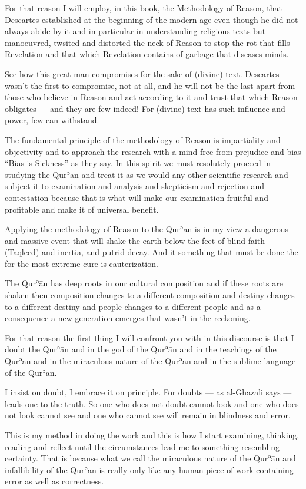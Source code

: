 \documentclass[12pt]{memoir}
\def\´{ʾ} %
\def \Quran{Qur\-\´ān} %
\let \Qrn=\Quran      %
\begin{document}
For that reason I will employ, in this book, the Methodology of Reason, that
Descartes established at the beginning of the modern age even though he did not
always abide by it and in particular in understanding religious texts but
manoeuvred, twsited and distorted the neck of Reason to stop the rot that fills
Revelation and that which Revelation contains of garbage that diseases minds.

See how this great man compromises for the sake of (divine) text. Descartes
wasn’t the first to compromise, not at all, and he will not be the last apart
from those who believe in Reason and act according to it and trust that which
Reason obligates — and they are few indeed! For (divine) text has such
influence and power, few can withstand.

The fundamental principle of the methodology of Reason is impartiality and
objectivity and to approach the research with a mind free from prejudice and
bias “Bias is Sickness” as they say. In this spirit we must resolutely proceed
in studying the \Qrn{} and treat it as we would any other scientific research
and subject it to examination and analysis and skepticism and rejection and
contestation because that is what will make our examination fruitful and
profitable and make it of universal benefit.

Applying the methodology of Reason to the \Qrn{} is in my view a dangerous and
massive event that will shake the earth below the feet of blind faith (Taqleed)
and inertia, and putrid decay. And it something that must be done the for the
most extreme cure is cauterization.

The \Qrn{} has deep roots in our cultural composition and if these roots are
shaken then composition changes to a different composition and destiny changes
to a different destiny and people changes to a different people and as a
consequence a new generation emerges that wasn’t in the reckoning.

For that reason the first thing I will confront you with in this discourse is
that I doubt the \Qrn{} and in the god of the \Qrn{} and in the teachings of
the \Qrn{} and in the miraculous nature of the \Qrn{} and in the sublime
language of the \Quran.

I insist on doubt, I embrace it on principle. For doubts — as al-Ghazali says —
leads one to the truth. So one who does not doubt cannot look and one who does
not look cannot see and one who cannot see will remain in blindness and error.

This is my method in doing the work and this is how I start examining,
thinking, reading and reflect until the circumstances lead me to something
resembling certainty. That is because what we call the miraculous nature of the
\Qrn{} and infallibility of the \Qrn{} is really only like any human piece of
work containing error as well as correctness.
\end{document}
